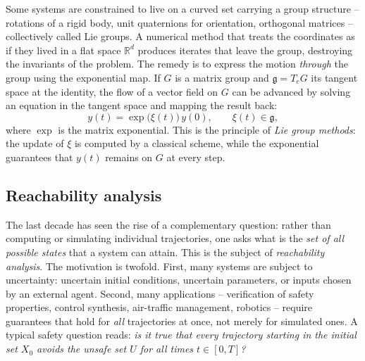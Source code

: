 \documentclass[11pt]{article}
\def\R{\mathbb{R}}
\begin{document}
Some systems are constrained to live on a curved set carrying a
group structure -- rotations of a rigid body, unit quaternions
for orientation, orthogonal matrices -- collectively called Lie
groups. A numerical method that treats the coordinates as if
they lived in a flat space $\R^d$ produces iterates that leave
the group, destroying the invariants of the problem. The remedy
is to express the motion \emph{through} the group using the
exponential map. If $G$ is a matrix group and
$\mathfrak g = T_eG$ its tangent space at the identity, the
flow of a vector field on $G$ can be advanced by solving an
equation in the tangent space and mapping the result back:
\begin{equation}\label{eq:exp}
  y(t) = \exp\bigl(\xi(t)\bigr)\,y(0),
  \qquad \xi(t)\in\mathfrak g,
\end{equation}
where $\exp$ is the matrix exponential. This is the principle
of \emph{Lie group methods}: the update of $\xi$ is computed by
a classical scheme, while the exponential guarantees that
$y(t)$ remains on $G$ at every step. 

\subsection{Reachability analysis}\label{sec:reachability}

The last decade has seen the rise of a complementary question:
rather than computing or simulating individual trajectories,
one asks what is the \emph{set of all possible states} that a
system can attain. This is the subject of \emph{reachability
analysis}. The motivation is twofold. First, many systems are
subject to uncertainty: uncertain initial conditions, uncertain
parameters, or inputs chosen by an external agent. Second,
many applications -- verification of safety properties,
control synthesis, air-traffic management, robotics -- require
guarantees that hold for \emph{all} trajectories at once, not
merely for simulated ones. A typical safety question reads:
\emph{is it true that every trajectory starting in the initial
set $X_0$ avoids the unsafe set $U$ for all times $t\in[0,T]$?}
\end{document}
